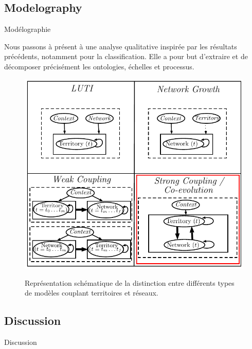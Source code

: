 \subsection{Modelography}{Modélographie}


Nous passons à présent à une analyse qualitative inspirée par les résultats précédents, notamment pour la classification. Elle a pour but d'extraire et de décomposer précisément les ontologies, échelles et processus.



\begin{figure}
\centering
\includegraphics[width=\textwidth]{Figures/Modelography/coevolution}
\caption{}{Représentation schématique de la distinction entre différents types de modèles couplant territoires et réseaux.}
\end{figure}














\subsection{Discussion}{Discussion}






